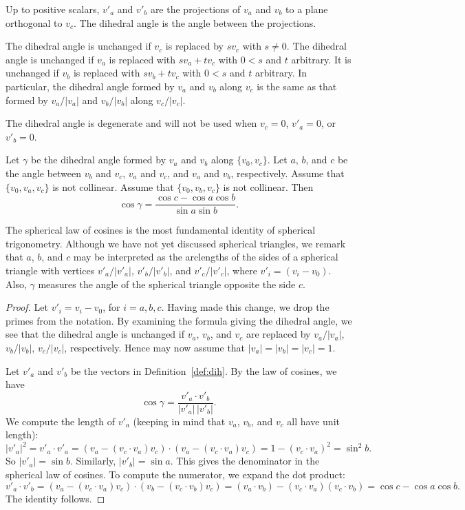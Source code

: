 Up to positive scalars, $v'_a$ and $v'_b$ are the projections of
$v_a$ and $v_b$ to a plane orthogonal to $v_c$.  The
dihedral angle is the angle between the projections.

The dihedral angle is unchanged if $v_c$ is replaced by $s v_c$ with
$s\ne0$. The dihedral angle is unchanged if $v_a$ is replaced with
$s v_a + t v_c$ with $0 < s$ and $t$ arbitrary.  It is unchanged if
$v_b$ is replaced with $s v_b + t v_c$ with $0 < s$ and $t$
arbitrary.  In particular, the dihedral angle formed by $v_a$ and
$v_b$ along $v_c$ is the same as that formed by $v_a/|v_a|$ and
$v_b/|v_b|$ along $v_c/|v_c|$.

The dihedral angle is degenerate and will not be used when $v_c =
0$, $v'_a = 0$, or $v'_b = 0$.




\begin{lemma}\label{lemma:sloc}
Let $\gamma$ be the dihedral angle formed by $v_a$ and $v_b$ along
$\{v_0,v_c\}$.  Let $a$, $b$, and $c$ be the
angle between $v_b$ and $v_c$, $v_a$ and $v_c$, and $v_a$ and
$v_b$, respectively. %
Assume that $\{v_0,v_a,v_c\}$ is not
collinear. Assume that $\{v_0,v_b,v_c\}$ is not collinear.
Then
    $$\cos\gamma = \frac{\cos c - \cos a \cos b}{\sin a\sin b}.$$
\end{lemma}

The spherical law of cosines is the most fundamental identity
of spherical trigonometry.
Although we have not yet discussed spherical
triangles, we remark that $a$, $b$, and $c$ may be interpreted as
the arclengths of the sides of a spherical triangle with
vertices $v'_a/|v'_a|$, $v'_b/|v'_b|$, and $v'_c/|v'_c|$,
where $v'_i = (v_i-v_0)$.  Also,
$\gamma$ measures the angle of the spherical triangle opposite the
side $c$.


\begin{proof}  Let $v'_i = v_i - v_0$, for $i=a,b,c$.  Having
made this change, we drop the primes from the notation.
By examining the formula giving the dihedral angle, we see that the
dihedral angle is unchanged if $v_a$, $v_b$, and $v_c$ are replaced
by $v_a/|v_a|$, $v_b/|v_b|$, $v_c/|v_c|$, respectively.  Hence
may now assume that $|v_a|=|v_b|=|v_c|=1$.

Let $v'_a$ and $v'_b$ be the vectors in Definition~\ref{def:dih}.
By the law of cosines, we have
        $$\cos\gamma = \frac{v'_a\cdot v'_b}{|v'_a|\,|v'_b|}.$$
We compute the length of $v'_a$ (keeping in mind that $v_a$, $v_b$,
and $v_c$ all have unit length):
        $$
        |v'_a|^2 = v'_a\cdot v'_a =
        (v_a - (v_c\cdot v_a)v_c)\cdot (v_a - (v_c\cdot v_a) v_c) =
        1 - (v_c\cdot v_a)^2 = \sin^2 b.
        $$
So $|v'_a| =\sin b$. Similarly, $|v'_b| = \sin a$.  This gives
the denominator in the spherical law of cosines. To compute the
numerator, we expand the dot product:
    $$
    v'_a\cdot v'_b = (v_a - (v_c\cdot v_a) v_c)\cdot (v_b - (v_c\cdot v_b) v_c)
    = (v_a\cdot v_b) - (v_c\cdot v_a) (v_c\cdot v_b) = \cos c - \cos
    a \cos b.
    $$
The identity follows.
\end{proof}

